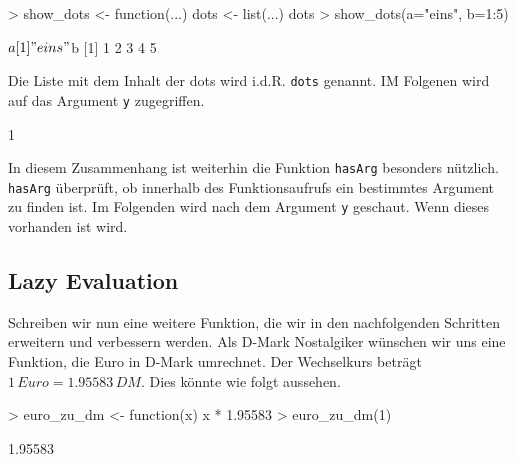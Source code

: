 \documentclass[12pt, a4paper,twoside,openany,x11names,svgnames]{memoir}
\begin{document}
\begin{Schunk}
\begin{Sinput}
> show_dots <- function(...) {
   dots <- list(...)
   dots
 }
> show_dots(a="eins", b=1:5)
\end{Sinput}
\begin{Soutput}
$a
[1] "eins"

$b
[1] 1 2 3 4 5
\end{Soutput}
\end{Schunk}

Die Liste mit dem Inhalt der dots wird i.d.R. \texttt{dots} genannt. IM Folgenen wird auf das Argument \texttt{y} zugegriffen.

\begin{Schunk}
\begin{Soutput}
[1] 1
\end{Soutput}
\end{Schunk}

In diesem Zusammenhang ist weiterhin die Funktion \texttt{hasArg} besonders nützlich. \texttt{hasArg} überprüft, ob innerhalb des Funktionsaufrufs ein bestimmtes Argument zu finden ist. Im Folgenden wird nach dem Argument \texttt{y} geschaut. Wenn dieses vorhanden ist wird.

\begin{Schunk}
\end{Schunk}


\subsection{Lazy Evaluation} \label{sec:lazy_evaluation}

Schreiben wir nun eine weitere Funktion, die wir in den nachfolgenden Schritten erweitern und verbessern werden. Als D-Mark Nostalgiker wünschen wir uns eine Funktion, die Euro in D-Mark umrechnet. Der Wechselkurs beträgt $1\,Euro = 1.95583\,DM$. Dies könnte wie folgt aussehen.

\begin{Schunk}
\begin{Sinput}
> euro_zu_dm <- function(x){
   x * 1.95583  
 }
> euro_zu_dm(1)
\end{Sinput}
\begin{Soutput}
[1] 1.95583
\end{Soutput}
\end{Schunk}
\end{document}
